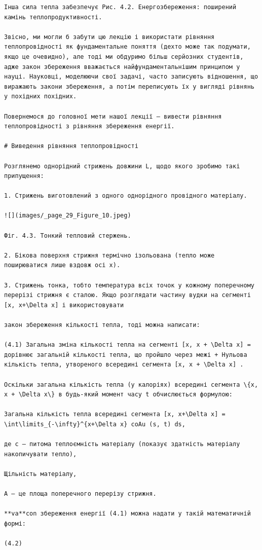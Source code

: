\documentclass[
  ukrainian,
]{article}
\begin{document}
\begin{verbatim}
Інша сила тепла забезпечує Рис. 4.2. Енергозбереження: поширений камінь теплопродуктивності.

Звісно, ми могли б забути цю лекцію і використати рівняння теплопровідності як фундаментальне поняття (дехто може так подумати, якщо це очевидно), але тоді ми обдуримо більш серйозних студентів, адже закон збереження вважається найфундаментальнішим принципом у науці. Науковці, моделюючи свої задачі, часто записують відношення, що виражають закони збереження, а потім переписують їх у вигляді рівнянь у похідних похідних.

Повернемося до головної мети нашої лекції — вивести рівняння теплопровідності з рівняння збереження енергії.

# Виведення рівняння теплопровідності

Розглянемо однорідний стрижень довжини L, щодо якого зробимо такі припущення:

1. Стрижень виготовлений з одного однорідного провідного матеріалу.

![](images/_page_29_Figure_10.jpeg)

Фіг. 4.3. Тонкий тепловий стержень.

2. Бікова поверхня стрижня термічно ізольована (тепло може поширюватися лише вздовж осі x).

3. Стрижень тонка, тобто температура всіх точок у кожному поперечному перерізі стрижня є сталою. Якщо розглядати частину вудки на сегменті [x, x+\Delta x] і використовувати

закон збереження кількості тепла, тоді можна написати:

(4.1) Загальна зміна кількості тепла на сегменті [x, x + \Delta x] = дорівнює загальній кількості тепла, що пройшло через межі + Нульова кількість тепла, утвореного всередині сегмента [x, x + \Delta x] .

Оскільки загальна кількість тепла (у калоріях) всередині сегмента \{x, x + \Delta x\} в будь-який момент часу t обчислюється формулою:

Загальна кількість тепла всередині сегмента [x, x+\Delta x] = \int\limits_{-\infty}^{x+\Delta x} coAu (s, t) ds,

де c — питома теплоємність матеріалу (показує здатність матеріалу накопичувати тепло),

Щільність матеріалу,

A — це площа поперечного перерізу стрижня.

**va**con збереження енергії (4.1) можна надати у такій математичній формі:

(4.2)
\end{verbatim}
\end{document}
